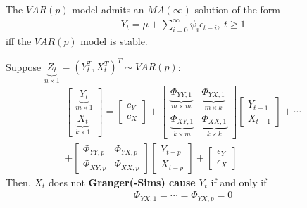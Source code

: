 \documentclass[11pt]{elegantbook}
\begin{document}
\begin{lemma}
    The $VAR(p)$ model admits an $MA(\infty)$ solution of the form
    \begin{equation}
        \begin{aligned}
            Y_t=\mu+\sum_{i=0}^\infty \psi_i\epsilon_{t-i},\ t\geq 1
        \end{aligned}
        \nonumber
    \end{equation}
    iff the $VAR(p)$ model is stable.
\end{lemma}

\begin{theorem}
    Suppose $\underbrace{Z_t}_{n\times 1}=\left(Y_t^T,X_t^T\right)^T\sim VAR(p)$:
    \begin{equation}
        \begin{aligned}
            \begin{bmatrix}
                \underbrace{Y_t}_{m\times 1}\\
                \underbrace{X_t}_{k\times 1}
            \end{bmatrix}
            =
            \begin{bmatrix}
                c_Y\\
                c_X
            \end{bmatrix}
            +
            \begin{bmatrix}
                \underbrace{\Phi_{YY,1}}_{m\times m}&  \underbrace{\Phi_{YX,1}}_{m\times k}\\
                \underbrace{\Phi_{XY,1}}_{k\times m}& \underbrace{\Phi_{XX,1}}_{k\times k}
            \end{bmatrix}
            \begin{bmatrix}
                Y_{t-1}\\
                X_{t-1}
            \end{bmatrix}
            +\cdots\\
            +
            \begin{bmatrix}
                \Phi_{YY,p}& \Phi_{YX,p}\\
                \Phi_{XY,p}& \Phi_{XX,p}
            \end{bmatrix}
            \begin{bmatrix}
                Y_{t-p}\\
                X_{t-p}
            \end{bmatrix}
            +
            \begin{bmatrix}
                \epsilon_Y\\
                \epsilon_X
            \end{bmatrix}
        \end{aligned}
        \nonumber
    \end{equation}
    Then, $X_t$ does not \textbf{Granger(-Sims) cause} $Y_t$ if and only if
    \begin{equation}
        \begin{aligned}
            \Phi_{YX,1}=\cdots=\Phi_{YX,p}=0
        \end{aligned}
        \nonumber
    \end{equation}
\end{theorem}
\end{document}

